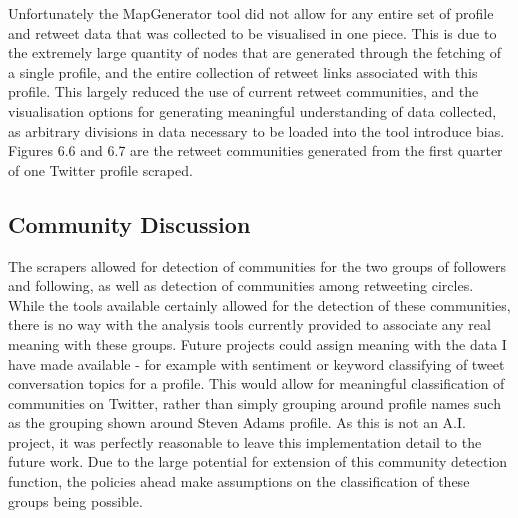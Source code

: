 Unfortunately the MapGenerator tool did not allow for any entire set of profile and retweet data that was collected to be visualised in one piece. This is due to the extremely large quantity of nodes that are generated through the fetching of a single profile, and the entire collection of retweet links associated with this profile. This largely reduced the use of current retweet communities, and the visualisation options for generating meaningful understanding of data collected, as arbitrary divisions in data necessary to be loaded into the tool introduce bias. Figures 6.6 and 6.7 are the retweet communities generated from the first quarter of one Twitter profile scraped. 






\subsection{Community Discussion}

The scrapers allowed for detection of communities for the two groups of followers and following, as well as detection of communities among retweeting circles. While the tools available certainly allowed for the detection of these communities, there is no way with the analysis tools currently provided to associate any real meaning with these groups. Future projects could assign meaning with the data I have made available - for example with sentiment or keyword classifying of tweet conversation topics for a profile. This would allow for meaningful classification of communities on Twitter, rather than simply grouping around profile names such as the grouping shown around Steven Adams profile. As this is not an A.I. project, it was perfectly reasonable to leave this implementation detail to the future work. Due to the large potential for extension of this community detection function, the policies ahead make assumptions on the classification of these groups being possible. 




